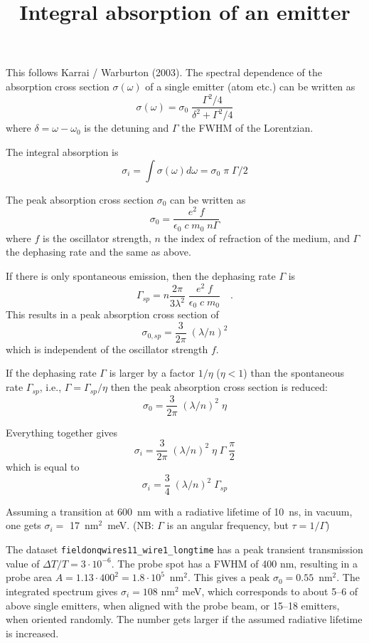 \documentclass[a4paper,10pt]{article}
\title{Integral absorption of an emitter}
\author{}
\begin{document}
\maketitle

\pagestyle{empty}
\thispagestyle{empty}

This follows Karrai / Warburton (2003). The spectral dependence of the
absorption cross section $\sigma(\omega)$ of a single emitter (atom etc.) can be
written as
\[
 \sigma(\omega) = \sigma_0 \; \frac{\Gamma^2 / 4}{\delta^2 + \Gamma^2 / 4}
\]
where $\delta = \omega - \omega_0$ is the detuning and $\Gamma$ the FWHM of the
Lorentzian.

The integral absorption is 
\[
 \sigma_i = \int \sigma(\omega) d\omega = \sigma_0 \; \pi \; \Gamma / 2
\]




The peak absorption cross section $\sigma_0$ can be written as 
\[
 \sigma_0 = \frac{e^2 \; f}{\epsilon_0 \; c \; m_0 \; n \Gamma}
\]
where $f$ is the oscillator strength, $n$ the index of refraction of the medium,
and $\Gamma$ the dephasing rate and the same as above.


If there is only spontaneous emission, then the dephasing rate $\Gamma$ is
\[
 \Gamma_{sp} = n \frac{2 \pi}{3 \lambda^2} \; \frac{e^2 \; f}{\epsilon_0 \; c\;
m_0} \quad .
\]
This results in a peak absorption cross section of
\[
 \sigma_{0,sp} =  \frac{3}{2 \pi} \;  (\lambda / n)^2 
\]
which is independent of the oscillator strength $f$.

If the dephasing rate $\Gamma$ is larger by a factor $1/\eta$ ($\eta < 1$) than
the spontaneous rate $\Gamma_{sp}$, i.e., $\Gamma = \Gamma_{sp} / \eta$ then the
peak absorption cross section is reduced:
\[
 \sigma_0 = \frac{3}{2 \pi} \;  (\lambda / n)^2 \; \eta
\]

Everything together gives
\[
 \sigma_i = \frac{3}{2 \pi} \;  (\lambda / n)^2 \; \eta \; \Gamma \;
\frac{\pi}{2}
\]
which is equal to 
\[
 \sigma_i = \frac{3}{4} \;  (\lambda / n)^2 \;  \Gamma_{sp} 
\]


Assuming a transition at 600~nm with a radiative lifetime of 10~ns, in vacuum,
one gets $\sigma_i =$ 17~nm$^2$~meV. (NB: $\Gamma$ is an angular frequency, but
$\tau = 1 /\Gamma$)

The dataset \verb|fieldonqwires11_wire1_longtime| has a peak transient
transmission value of $\Delta T /T = 3 \cdot 10^{-6}$. The probe spot has a FWHM
of 400 nm, resulting in a probe area $A = 1.13 \cdot 400^2 = 1.8 \cdot
10^5$~nm$^2$. This gives a peak $\sigma_0 = 0.55 $~nm$^2$. The integrated
spectrum gives $\sigma_i = 108$ nm$^2$ meV, which corresponds to about 5--6 of
above single emitters, when aligned with the probe beam, or 15--18 emitters,
when oriented randomly. The number gets larger if the assumed radiative lifetime
is increased.
\end{document}
